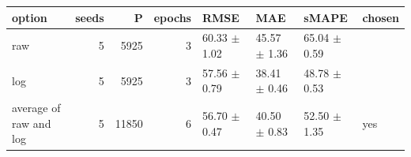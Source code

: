 \begin{tabular}{lrrrllll}
\toprule
option & seeds & P & epochs & RMSE & MAE & sMAPE & chosen \\
\midrule
raw & 5 & 5925 & 3 & 60.33 $\pm$ 1.02 & 45.57 $\pm$ 1.36 & 65.04 $\pm$ 0.59 &  \\
log & 5 & 5925 & 3 & 57.56 $\pm$ 0.79 & 38.41 $\pm$ 0.46 & 48.78 $\pm$ 0.53 &  \\
average of raw and log & 5 & 11850 & 6 & 56.70 $\pm$ 0.47 & 40.50 $\pm$ 0.83 & 52.50 $\pm$ 1.35 & yes \\
\bottomrule
\end{tabular}
